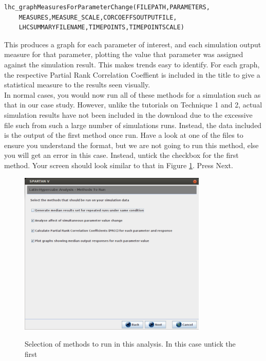\documentclass[a4paper,11pt]{article}
\begin{document}
\begin{enumerate}
\begin{verbatim}
lhc_graphMeasuresForParameterChange(FILEPATH,PARAMETERS,
	MEASURES,MEASURE_SCALE,CORCOEFFSOUTPUTFILE,
	LHCSUMMARYFILENAME,TIMEPOINTS,TIMEPOINTSCALE)
\end{verbatim}

This produces a graph for each parameter of interest, and each simulation output measure for that parameter, plotting the value that parameter was assigned against the simulation result. This makes trends easy to identify. For each graph, the respective Partial Rank Correlation Coeffient is included in the title to give a statistical measure to the results seen visually. 
\\
In normal cases, you would now run all of these methods for a simulation such as that in our case study. However, unlike the tutorials on Technique 1 and 2, actual simulation results have not been included in the download due to the excessive file such from such a large number of simulations runs. Instead, the data included is the output of the first method once run. Have a look at one of the files to ensure you understand the format, but we are not going to run this method, else you will get an error in this case. Instead, untick the checkbox for the first method. Your screen should look similar to that in Figure \ref{LHC_Screen5}. Press Next.

\begin{figure}
\centering
    \includegraphics[width=0.8\textwidth]{SpartanV_LHC5.png}\\ \noindent
    \caption{Selection of methods to run in this analysis. In this case untick the first}
    \label{LHC_Screen5}
    \newpage 
\end{figure}


\end{enumerate}
\end{document}
